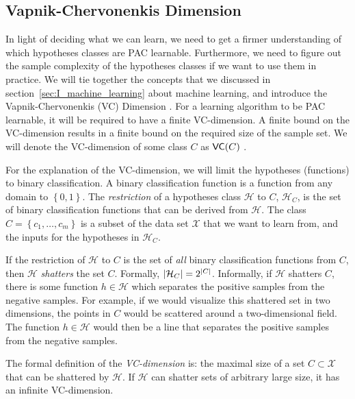 \documentclass[../main.tex]{subfiles}
\begin{document}
\subsection{Vapnik-Chervonenkis Dimension}
\label{sec:I_vc_dimension}

In light of deciding what we can learn, we need to get a firmer understanding of which hypotheses classes are PAC learnable.
Furthermore, we need to figure out the sample complexity of the hypotheses classes if we want to use them in practice.
We will tie together the concepts that we discussed in section~\ref{sec:I_machine_learning} about machine learning,
and introduce the Vapnik-Chervonenkis (VC) Dimension \cite{Vapnik2015}.
For a learning algorithm to be PAC learnable, it will be required to have a finite VC-dimension.
A finite bound on the VC-dimension results in a finite bound on the required size of the sample set.
We will denote the VC-dimension of some class $C$ as $\mathsf{VC}(C)$
\cite[Chapter~6]{Shalev2014understanding}.


For the explanation of the VC-dimension, we will limit the hypotheses (functions) to binary classification.
A binary classification function is a function from any domain to $\left\{ 0, 1 \right\}$.
The \emph{restriction} of a hypotheses class $\mathcal{H}$ to $C$, $\mathcal{H}_{C}$,
is the set of binary classification functions that can be derived from $\mathcal{H}$.
The class $C = \left\{c_{1}, \ldots, c_{m} \right\} $ is a subset of the data set $\mathcal{X}$ that we want to learn from,
and the inputs for the hypotheses in $\mathcal{H}_{C}$.


If the restriction of $\mathcal{H}$ to $C$ is the set of \emph{all} binary classification functions from $C$,
then $\mathcal{H}$ \emph{shatters} the set $C$. Formally, $\lvert\mathcal{H}_{C}\rvert = 2^{\lvert C\rvert}$.
Informally, if $\mathcal{H}$ shatters $C$, there is some function $h \in \mathcal{H}$ which separates the positive samples from the negative samples.
For example, if we would visualize this shattered set in two dimensions, the points in $C$ would be scattered around a two-dimensional field.
The function $h \in \mathcal{H}$ would then be a line that separates the positive samples from the negative samples.


The formal definition of the \emph{VC-dimension} is: the maximal size of a set $C \subset \mathcal{X}$ that can be
shattered by $\mathcal{H}$. If $\mathcal{H}$ can shatter sets of arbitrary large size, it has an infinite VC-dimension.
\end{document}
